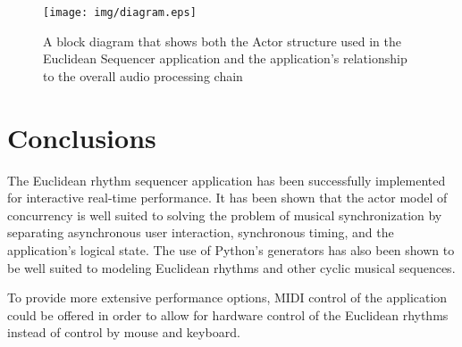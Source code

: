 \documentclass{sig-alternate-05-2015}
\begin{document}
\begin{figure}
\centering
\texttt{[image: img/diagram.eps]}
\caption{A block diagram that shows both the Actor structure used in
the Euclidean Sequencer application and the application's relationship
to the overall audio processing chain}
\label{block-diagram}
\end{figure}

\section{Conclusions}

The Euclidean rhythm sequencer application has been successfully implemented for interactive real-time performance. It has been shown that the actor model of concurrency is well suited to solving the problem of musical synchronization by separating asynchronous user interaction, synchronous timing, and the application's logical state. The use of Python's generators has also been shown to be well suited to modeling Euclidean rhythms and other cyclic musical sequences.

To provide more extensive performance options, MIDI control of the application could be offered in order to allow for hardware control of the Euclidean rhythms instead of control by mouse and keyboard. 

%

\end{document}
